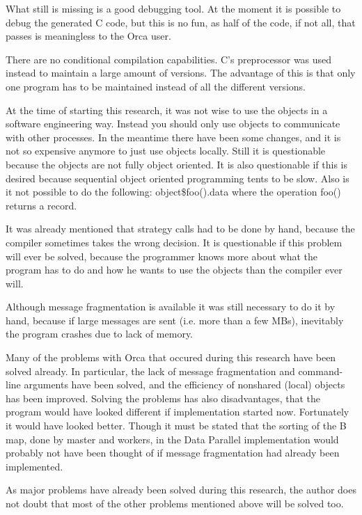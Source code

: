 What still is missing is a good debugging tool.
At the moment it is possible to debug the generated C code, but this
is no fun, as half of the code, if not all, that passes is meaningless
to the Orca user.

There are no conditional compilation capabilities.
C's preprocessor was used instead to maintain a large amount of versions.
The advantage of this is that only one program has to be maintained
instead of all the different versions.

At the time of starting this research, it was not wise to use the
objects in a software engineering way.
Instead you should only use objects to communicate with other processes.
In the meantime there have been some changes, and it is not so
expensive anymore to just use objects locally.
Still it is questionable because the objects are not fully object
oriented.
It is also questionable if this is desired because sequential object
oriented programming tents to be slow.
Also is it not possible to do the following:
object\$foo().data where the operation foo() returns a record.

It was already mentioned that strategy calls had to be done by hand,
because the compiler sometimes takes the wrong decision.
It is questionable if this problem will ever be solved,  because
the programmer knows more about what the program has to do and how he
wants to use the objects than the compiler ever will.

Although message fragmentation is available it was still necessary to
do it by hand, because if large messages are sent (i.e. more than a
few MBs), inevitably the program crashes due to lack of memory.

Many of the problems with Orca that occured during this research have
been solved already.
In particular, the lack of message fragmentation and command-line
arguments have been solved, and the efficiency of nonshared (local)
objects has been improved.
Solving the problems has also disadvantages, that the program would have
looked different if implementation started now.
Fortunately it would have looked better.
Though it must be stated that the sorting of the B map, done by master
and workers, in the Data Parallel implementation would probably not
have been thought of if message fragmentation had already been
implemented.

As major problems have already been solved during this research,
the author does not doubt that most of the other problems mentioned
above will be solved too.
